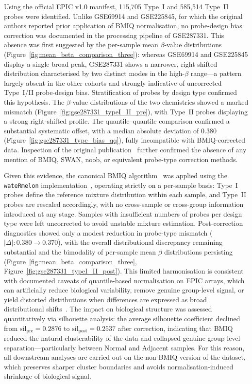 Using the official EPIC v1.0 manifest, 115{,}705 Type~I and 585{,}514 Type~II
probes were identified. Unlike GSE69914 and GSE225845, for which the original
authors reported prior application of BMIQ normalisation, no probe-design bias
correction was documented in the processing pipeline of GSE287331. This absence
was first suggested by the per-sample mean $\beta$-value distributions
(Figure~\ref{fig:mean_beta_comparison_three}): whereas GSE69914 and GSE225845
display a single broad peak, GSE287331 shows a narrower, right-shifted
distribution characterised by two distinct modes in the high-$\beta$ range---a
pattern largely absent in the other cohorts and strongly indicative of uncorrected
Type~I/II probe-design bias.
Stratification of probes by design type confirmed this hypothesis. The
$\beta$-value distributions of the two chemistries showed a marked mismatch
(Figure~\ref{fig:gse287331_typeI_II_pre}), with Type~II probes displaying a
strong right-shifted profile. The quantile--quantile comparison confirmed a
substantial systematic offset, with a median absolute deviation of $0.380$
(Figure~\ref{fig:gse287331_type_bias_qq}), fully incompatible with BMIQ-corrected
data. Inspection of the original publication~\cite{Lord2024GSE287331} further
confirmed the absence of any mention of BMIQ, SWAN, noob, or equivalent
probe-type correction methods.

Given this evidence, the canonical BMIQ algorithm~\cite{Teschendorff2013BMIQ}
was applied using the \texttt{wateRmelon} implementation~\cite{Pidsley2013wateRmelon},
operating strictly on a per-sample basis: Type~I probes define the reference
mixture distribution within each sample, and Type~II probes are rescaled
accordingly, with no cross-sample or cross-group information introduced at any
stage. Samples with insufficient numbers of probes per design type were left
uncorrected to avoid unstable mixture estimation.
Post-correction diagnostics showed only a modest reduction in probe-type mismatch
($|\Delta| : 0.380 \rightarrow 0.370$), with the overall distributional discrepancy
remaining substantial and the bimodality of per-sample mean $\beta$ distributions
persisting (Figure~\ref{fig:mean_beta_comparison_three},
Figure~\ref{fig:gse287331_typeI_II_post}). This limited harmonisation is consistent
with documented caveats of quantile-based normalisation on EPIC arrays, which can
artificially reduce biological variability, remove genuine group-level signal, or
yield distorted distributions when differences are expressed as broad distributional
shifts~\cite{Yousefi2013, Welsh2023EPICnorm, Liu2016Processing}.
The impact on biological structure was assessed quantitatively via silhouette
analysis: the average silhouette coefficient declined from
$\mathrm{sil}_{\text{pre}} = 0.2876 \text{ to } \mathrm{sil}_{\text{post}} = 0.2537$
after correction, indicating that BMIQ reduced the natural clusterability of the
data and collapsed genuine group-level separation---particularly between Normal
and Adjacent samples. For this reason, all downstream analyses are carried out on
the non-BMIQ version of the dataset, which preserves sharper cluster boundaries
and avoids normalisation-induced shrinkage of biological signal.



